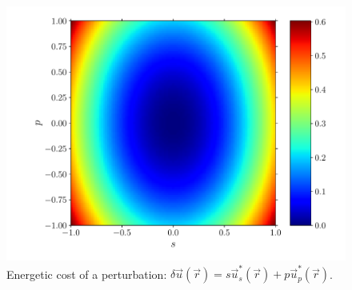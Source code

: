 \documentclass[fleqn]{goose-article}
\begin{document}
\begin{figure}[htp]
    \centering
    \includegraphics[width=.5\textwidth]{perturbation_phase-diagram_energy.pdf}
    \caption{
        Energetic cost of a perturbation:
        $\delta \vec{u}(\vec{r}) = s \vec{u}^*_s (\vec{r}) + p \vec{u}^*_p (\vec{r})$.
    }
    \label{fig:energy}
\end{figure}
\end{document}
